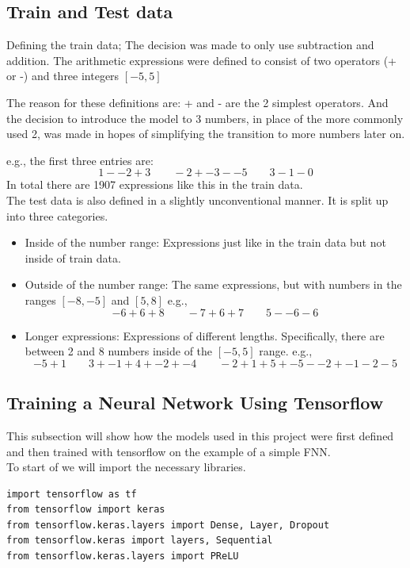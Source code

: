 \documentclass{article}
\begin{document}
\subsection{Train and Test data}
Defining the train data; The decision was made to only use subtraction and 
addition. The arithmetic expressions were defined to consist of two 
operators (+ or -) and three integers $[-5, 5]$

The reason for these definitions are: + and - are the 2 simplest operators. 
And the decision to introduce the model to 3 numbers, in place of the more 
commonly used 2, was made in hopes of simplifying the transition to more 
numbers later on.

e.g., the first three entries are: 
\[
1 - -2 + 3 \qquad -2 + -3 - -5 \qquad 3 - 1 - 0
\]
{\small In total there are 1907 expressions like this in the train data.}
\\[2em]
The test data is also defined in a slightly unconventional manner. It is 
split up into three categories.
\begin{itemize}
    \item Inside of the number range: Expressions just like in the train 
data but not inside of train data. 
    \item Outside of the number range: The same expressions, but with 
numbers in the ranges $[-8, -5]$ and $[5, 8]$ e.g.,
\[
-6 + 6 + 8 \qquad -7 + 6 + 7 \qquad 5 - -6 - 6
\]
    \item Longer expressions: Expressions of different lengths. 
Specifically, there are between 2 and 8 numbers inside of the $[-5, 5]$ 
range. e.g.,
\[
-5 + 1 \qquad 3 + -1 + 4 + -2 + -4 \qquad -2 + 1 + 5 + -5 - -2 + -1 - 2 - 5
\]
\end{itemize}

\subsection{Training a Neural Network Using Tensorflow}
This subsection will show how the models used in this project were first 
defined and then trained with tensorflow on the example of a simple FNN.
\\[2em]
To start of we will import the necessary libraries.
\begin{Verbatim}
import tensorflow as tf
from tensorflow import keras
from tensorflow.keras.layers import Dense, Layer, Dropout
from tensorflow.keras import layers, Sequential
from tensorflow.keras.layers import PReLU
\end{Verbatim}
\end{document}
